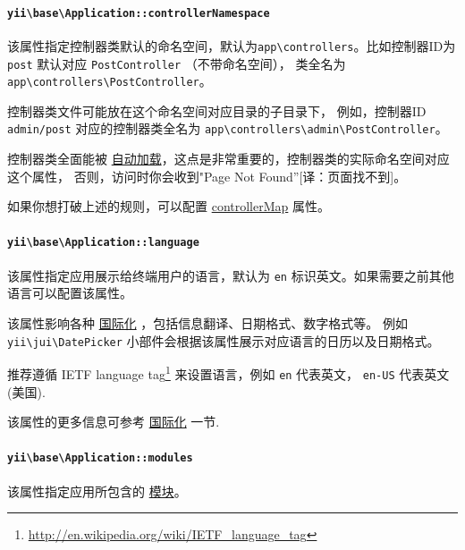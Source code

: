 \paragraph{\texttt{yii{\allowbreak{}\textbackslash}base{\allowbreak{}\textbackslash}Application\allowbreak{}::\allowbreak{}controllerNamespace} \label{structure-applications.md::controllerNamespace}}
该属性指定控制器类默认的命名空间，默认为\lstinline|app\controllers|。比如控制器ID为 \lstinline|post| 默认对应 \lstinline|PostController| （不带命名空间），
类全名为 \lstinline|app\controllers\PostController|。

控制器类文件可能放在这个命名空间对应目录的子目录下，
例如，控制器ID \lstinline|admin/post| 对应的控制器类全名为 \lstinline|app\controllers\admin\PostController|。

控制器类全面能被 \hyperref[concept-autoloading.md]{自动加载}，这点是非常重要的，控制器类的实际命名空间对应这个属性，
否则，访问时你会收到"Page Not Found''[译：页面找不到]。

如果你想打破上述的规则，可以配置 \hyperref[structure-applications.md::::controllerMap]{controllerMap} 属性。

\paragraph{\texttt{yii{\allowbreak{}\textbackslash}base{\allowbreak{}\textbackslash}Application\allowbreak{}::\allowbreak{}language} \label{structure-applications.md::language}}
该属性指定应用展示给终端用户的语言，默认为 \lstinline|en| 标识英文。如果需要之前其他语言可以配置该属性。

该属性影响各种 \hyperref[tutorial-i18n.md]{国际化} ，包括信息翻译、日期格式、数字格式等。
例如 \texttt{yii{\allowbreak{}\textbackslash}jui{\allowbreak{}\textbackslash}DatePicker} 小部件会根据该属性展示对应语言的日历以及日期格式。

推荐遵循 IETF language tag\footnote{\url{http://en.wikipedia.org/wiki/IETF\_language\_tag}} 来设置语言，例如 \lstinline|en| 代表英文， \lstinline|en-US| 代表英文(美国).

该属性的更多信息可参考 \hyperref[tutorial-i18n.md]{国际化} 一节.

\paragraph{\texttt{yii{\allowbreak{}\textbackslash}base{\allowbreak{}\textbackslash}Application\allowbreak{}::\allowbreak{}modules} \label{structure-applications.md::modules}}
该属性指定应用所包含的 \hyperref[structure-modules.md]{模块}。

